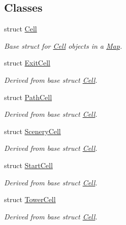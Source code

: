 \subsection*{Classes}
\begin{DoxyCompactItemize}
\item 
struct \hyperlink{struct_map_1_1_cell}{Cell}
\begin{DoxyCompactList}\small\item\em Base struct for \hyperlink{struct_map_1_1_cell}{Cell} objects in a \hyperlink{class_map}{Map}. \end{DoxyCompactList}\item 
struct \hyperlink{struct_map_1_1_exit_cell}{Exit\+Cell}
\begin{DoxyCompactList}\small\item\em Derived from base struct \hyperlink{struct_map_1_1_cell}{Cell}. \end{DoxyCompactList}\item 
struct \hyperlink{struct_map_1_1_path_cell}{Path\+Cell}
\begin{DoxyCompactList}\small\item\em Derived from base struct \hyperlink{struct_map_1_1_cell}{Cell}. \end{DoxyCompactList}\item 
struct \hyperlink{struct_map_1_1_scenery_cell}{Scenery\+Cell}
\begin{DoxyCompactList}\small\item\em Derived from base struct \hyperlink{struct_map_1_1_cell}{Cell}. \end{DoxyCompactList}\item 
struct \hyperlink{struct_map_1_1_start_cell}{Start\+Cell}
\begin{DoxyCompactList}\small\item\em Derived from base struct \hyperlink{struct_map_1_1_cell}{Cell}. \end{DoxyCompactList}\item 
struct \hyperlink{struct_map_1_1_tower_cell}{Tower\+Cell}
\begin{DoxyCompactList}\small\item\em Derived from base struct \hyperlink{struct_map_1_1_cell}{Cell}. \end{DoxyCompactList}\end{DoxyCompactItemize}

